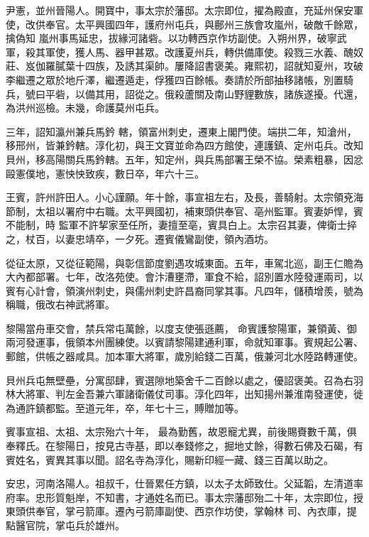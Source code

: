 \begin{pinyinscope}
 尹憲，並州晉陽人。開寶中，事太宗於藩邸。太宗即位，擢為殿直，充延州保安軍使，改供奉官。太平興國四年，護府州屯兵，與鄜州三族會攻嵐州，破敵千餘眾，擒偽知
 嵐州事馬延忠，拔緣河諸砦。以功轉西京作坊副使。入朔州界，破寧武軍，殺其軍使，獲人馬、器甲甚眾。改護夏州兵，轉供備庫使。殺戮三水義、醜奴莊、岌伽羅膩葉十四族，及誘其渠帥。屢降詔書褒美。雍熙初，詔就知夏州，攻破李繼遷之眾於地斤澤，繼遷遁走，俘獲四百餘帳。奏請於所部抽移諸帳，別置騎兵，號曰平砦，以備其用，詔從之。俄殺蘆關及南山野貍數族，諸族遂擾。代還，為洪州巡檢。未幾，命護莫州屯兵。



 三年，詔知瀛州兼兵馬鈐
 轄，領富州刺史，遷東上閣門使。端拱二年，知滄州，移邢州，皆兼鈐轄。淳化初，與王文寶並命為四方館使，連護鎮、定州屯兵。改知貝州，移高陽關兵馬鈐轄。五年，知定州，與兵馬部署王榮不協。榮素粗暴，因忿毆憲僕地，憲怏怏致疾，數日卒，年六十三。



 王賓，許州許田人。小心謹願。年十餘，事宣祖左右，及長，善騎射。太宗領兗海節制，太祖以署府中右職。太平興國初，補東頭供奉官、亳州監軍。賓妻妒悍，賓不能制，時
 監軍不許挈家至任所，妻擅至亳，賓具白上。太宗召其妻，俾衛士捽之，杖百，以妻忠靖卒，一夕死。遷賓儀鸞副使，領內酒坊。



 從征太原，又從征範陽，與彰信節度劉遇攻城東面。五年，車駕北巡，副王仁贍為大內都部署。七年，改洛苑使。會汴漕壅滯，軍食不給，詔別置水陸發運兩司，以賓有心計會，領演州刺史，與儒州刺史許昌裔同掌其事。凡四年，儲積增羨，號為稱職，俄改右神武將軍。



 黎陽當舟車交會，禁兵常屯萬餘，以度支使張遜薦，
 命賓護黎陽軍，兼領黃、御兩河發運事，俄領本州團練使。以賓請黎陽建通利軍，命就知軍事。賓規起公署、郵館，供帳之器咸具。加本軍大將軍，歲別給錢二百萬，俄兼河北水陸路轉運使。



 貝州兵屯無壁壘，分寓邸肆，賓選隙地築舍千二百餘以處之，優詔褒美。召為右羽林大將軍、判左金吾兼六軍諸衛儀仗司事。淳化四年，出知揚州兼淮南發運使，徙為通許鎮都監。至道元年，卒，年七十三，賻贈加等。



 賓事宣祖、太祖、太宗殆六十年，
 最為勤舊，故恩寵尤異，前後賜賚數千萬，俱奉釋氏。在黎陽日，按見古寺基，即以奉錢修之，掘地丈餘，得數石佛及石碣，有賓姓名，賓異其事以聞。詔名寺為淳化，賜新印經一藏、錢三百萬以助之。



 安忠，河南洛陽人。祖叔千，仕晉累任方鎮，以太子太師致仕。父延韜，左清道率府率。忠形質魁岸，不知書，才通姓名而已。事太宗藩邸殆二十年，太宗即位，授東頭供奉官，掌弓箭庫。遷內弓箭庫副使、西京作坊使，掌翰林
 司、內衣庫，提點醫官院，掌屯兵於雄州。




\end{pinyinscope}
